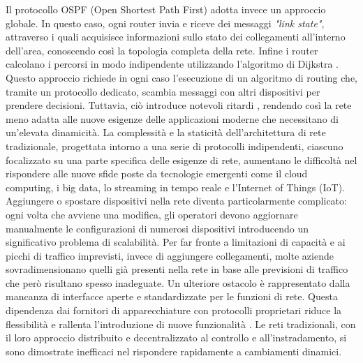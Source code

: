 Il protocollo OSPF (Open Shortest Path First) adotta invece un approccio globale.
In questo caso, ogni router invia e riceve dei messaggi \textit{"link state"}, attraverso i quali acquisisce informazioni sullo stato dei collegamenti
all'interno dell'area, conoscendo così la topologia completa della rete.
Infine i router calcolano i percorsi in modo indipendente utilizzando l'algoritmo di Dijkstra \cite{ospf}. 
\newline Questo approccio richiede in ogni caso l'esecuzione di un algoritmo di routing che, tramite un protocollo dedicato, 
scambia messaggi con altri dispositivi per prendere decisioni.
\newline Tuttavia, ciò introduce notevoli ritardi \cite{tesiSDN:2017}, rendendo così la rete meno adatta alle nuove esigenze delle applicazioni moderne che necessitano di un'elevata dinamicità.
\newline La complessità e la staticità dell'architettura di rete tradizionale, progettata intorno a una serie di protocolli indipendenti, ciascuno focalizzato su una parte specifica delle esigenze di rete, 
aumentano le difficoltà nel rispondere alle nuove sfide poste da tecnologie emergenti come il cloud computing, i big data, lo streaming in tempo reale e l'Internet of Things (IoT).
\newline Aggiungere o spostare dispositivi nella rete diventa particolarmente complicato: ogni volta che avviene una modifica, gli operatori devono aggiornare manualmente le configurazioni di numerosi dispositivi introducendo un significativo problema di scalabilità.
Per far fronte a limitazioni di capacità e ai picchi di traffico imprevisti, invece di aggiungere collegamenti, molte aziende sovradimensionano quelli già presenti nella rete in base alle previsioni di traffico che però risultano spesso inadeguate.
\newline Un ulteriore ostacolo è rappresentato dalla mancanza di interfacce aperte e standardizzate per le funzioni di rete. %
Questa dipendenza dai fornitori di apparecchiature con protocolli proprietari riduce la flessibilità e rallenta l'introduzione di nuove funzionalità \cite{probtrad}.
\newline Le reti tradizionali, con il loro approccio distribuito e decentralizzato al controllo e all'instradamento, si sono dimostrate inefficaci nel rispondere rapidamente a cambiamenti dinamici.
